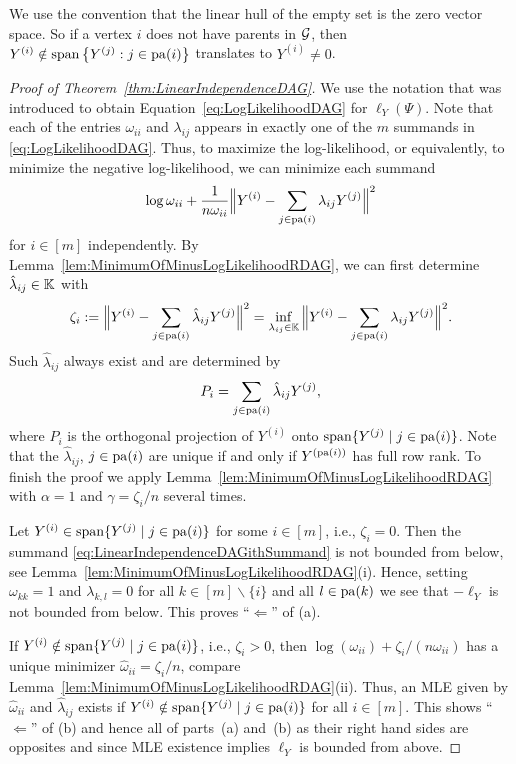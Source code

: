 \begin{remark} \label{rem:LinearHullEmptySet}
	We use the convention that the linear hull of the empty set is the zero vector space. So if a vertex $i$ does not have parents in $\mathcal{G}$, then $ Y^{(i)} \notin \operatorname{span} \big\lbrace Y^{(j)} : j \in \operatorname{pa}(i)  \big\rbrace$ translates to $Y^{(i)} \neq 0$.
	\hfill\remSymbol
\end{remark}

\begin{proof}[Proof of Theorem~\ref{thm:LinearIndependenceDAG}]
	We use the notation that was introduced to obtain Equation~\eqref{eq:LogLikelihoodDAG} for $\ell_Y(\Psi)$. Note that each of the entries $\omega_{ii}$ and $\lambda_{ij}$ appears in exactly one of the $m$ summands in \eqref{eq:LogLikelihoodDAG}. Thus, to maximize the log-likelihood, or equivalently, to minimize the negative log-likelihood, we can minimize each summand
		\begin{equation}\label{eq:LinearIndependenceDAGithSummand}
			\log \omega_{ii} + \frac{1}{n \omega_{ii}} \Big\| Y^{(i)} - \sum_{j \in \operatorname{pa}(i)} \lambda_{ij} Y^{(j)} \Big\|^2
		\end{equation}
	for $i \in [m]$ independently. By Lemma~\ref{lem:MinimumOfMinusLogLikelihoodRDAG}, we can first determine $\hat{\lambda}_{ij} \in \mathbb K$ with
		\[ \zeta_i := \Big\| Y^{(i)} - \sum_{j \in \operatorname{pa}(i)} \hat{\lambda}_{ij} Y^{(j)} \Big\|^2 =
		\inf_{\lambda_{ij} \in \mathbb K} \Big\| Y^{(i)} - \sum_{j \in \operatorname{pa}(i)} \lambda_{ij} Y^{(j)} \Big\|^2 .\]
	Such $\hat{\lambda}_{ij}$ always exist and are determined by
		\[P_i = \sum_{j \in \operatorname{pa}(i)} \hat{\lambda}_{ij} Y^{(j)}, \]
	where $P_i$ is the orthogonal projection of $Y^{(i)}$ onto $\operatorname{span} \{ Y^{(j)} \mid j \in \operatorname{pa}(i) \}$. Note that the $\hat{\lambda}_{ij}$, $j \in \operatorname{pa}(i)$ are unique if and only if $Y^{(\operatorname{pa}(i))}$ has full row rank. To finish the proof we apply Lemma~\ref{lem:MinimumOfMinusLogLikelihoodRDAG} with $\alpha = 1$ and $\gamma = \zeta_i/n$ several times.
	
	Let $Y^{(i)} \in \operatorname{span} \{ Y^{(j)} \mid j \in \operatorname{pa}(i) \}$ for some $i \in [m]$, i.e., $\zeta_i = 0$. Then the summand \eqref{eq:LinearIndependenceDAGithSummand} is not bounded from below, see Lemma~\ref{lem:MinimumOfMinusLogLikelihoodRDAG}(i). Hence, setting $\omega_{kk} = 1$ and $\lambda_{k,l} = 0$ for all $k \in [m]\backslash \{i\}$ and all $l \in \operatorname{pa}(k)$ we see that $-\ell_Y$ is not bounded from below. This proves ``$\Leftarrow$'' of (a).
	
	If $Y^{(i)} \notin \operatorname{span} \{ Y^{(j)} \mid j \in \operatorname{pa}(i) \}$, i.e.,  $\zeta_i > 0$, then $\log(\omega_{ii}) + \zeta_i/(n \omega_{ii})$ has a unique minimizer $\hat{\omega}_{ii} = \zeta_i / n$, compare Lemma~\ref{lem:MinimumOfMinusLogLikelihoodRDAG}(ii). Thus, an MLE given by $\hat{\omega}_{ii}$ and $\hat{\lambda}_{ij}$ exists if $Y^{(i)} \notin \operatorname{span} \{ Y^{(j)} \mid j \in \operatorname{pa}(i) \}$ for all $i \in [m]$. This shows ``$\Leftarrow$'' of (b) and hence all of parts~(a) and~(b) as their right hand sides are opposites and since MLE existence implies $\ell_{Y}$ is bounded from above.
	

\end{proof}
